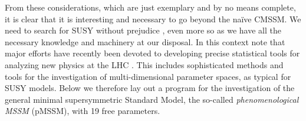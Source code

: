 From these considerations, which are just exemplary and by no means complete, 
it is clear that it is interesting and necessary to go beyond the na\"ive 
CMSSM. We need to search for SUSY without prejudice \cite{Berger:2008cq,Conley:2010du},  
even more so as we have all the necessary knowledge and machinery at 
our disposal. In this context note that major efforts have recently been 
devoted to developing precise statistical tools for analyzing new physics 
at the LHC \cite{Lyons:2003bw}. 
This includes sophisticated methods and tools for the investigation of 
multi-dimensional parameter spaces, as typical for SUSY models. 
Below we therefore lay out a program for the investigation of the 
general minimal supersymmetric Standard Model, the so-called 
{\it phenomenological MSSM} (pMSSM), with 19 free parameters. 



